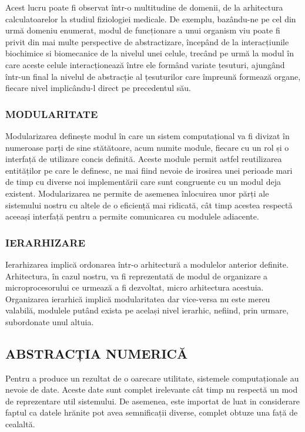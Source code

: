 \documentclass[12pt]{article}
\begin{document}
Acest lucru poate fi observat într-o multitudine de domenii, de la arhitectura calculatoarelor la studiul fiziologiei medicale. De exemplu, bazându-ne pe cel din urmă domeniu enumerat, modul de funcționare a unui organism viu poate fi privit din mai multe perspective de abstractizare, începând de la interacțiunile biochimice si biomecanice de la nivelul unei celule, trecând pe urmă la modul în care aceste celule interacționează între ele formând variate țesuturi, ajungând într-un final la nivelul de abstracție al țesuturilor care împreună formează organe, fiecare nivel implicându-l direct pe precedentul său.

\subsubsection{MODULARITATE}
Modularizarea definește modul în care un sistem computațional va fi divizat în numeroase parți de sine stătătoare, acum numite module, fiecare cu un rol și o interfață de utilizare concis definită. Aceste module permit astfel reutilizarea  entităților pe care le definesc, ne mai fiind nevoie de irosirea unei perioade mari de timp cu diverse noi implementării care sunt congruente cu un modul deja existent. Modularizarea ne permite de asemenea înlocuirea unor părți ale sistemului nostru cu altele de o eficiență mai ridicată, cât timp acestea respectă aceeași interfață pentru a permite comunicarea cu modulele adiacente.

\subsubsection{IERARHIZARE}
Ierarhizarea implică ordonarea într-o arhitectură a modulelor anterior definite. Arhitectura, în cazul nostru, va fi reprezentată de modul de organizare a microprocesorului ce urmează a fi dezvoltat, micro arhitectura acestuia. Organizarea ierarhică implică modularitatea dar vice-versa nu este mereu valabilă, modulele putând exista pe același nivel ierarhic, nefiind, prin urmare, subordonate unul altuia.

\subsection{ABSTRACȚIA NUMERICĂ}
Pentru a produce un rezultat de o oarecare utilitate, sistemele computaționale au nevoie de date. Aceste date sunt complet irelevante cât timp nu respectă un mod de reprezentare util sistemului. De asemenea, este importat de luat in considerare faptul ca datele hrănite pot avea semnificații diverse, complet obtuze una față de cealaltă.
\end{document}

